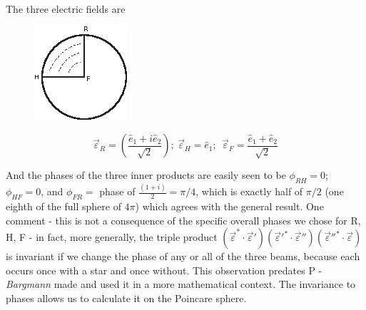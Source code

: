The three electric fields are
\begin{figure}[H]
\centering
\includegraphics[scale=0.8]{src/images/chap26/11.jpg}
\end{figure}
$$
\overrightarrow{\varepsilon}_R = \left(\frac{\hat{e}_1 + i \hat{e}_2}{\sqrt{2}} \right); ~ \overrightarrow{\varepsilon}_H = \hat{e}_1 ; ~~ \overrightarrow{\varepsilon}_F = \frac{\hat{e}_1  + \hat{e}_2}{\sqrt{2}}
$$

And the phases of the three inner products are easily seen to be $\phi_{RH} = 0$; $\phi_{HF} =0$, and $\phi_{FR} =$ phase of $\frac{(1+i)}{2} = \pi/4$, which is exactly half of $\pi/2$ (one eighth of the full sphere of $4\pi$) which agrees with the general result. One comment - this is not a consequence of the specific overall phases we chose for R, H, F - in fact, more generally, the triple product $(\overrightarrow{\varepsilon}^{\ast} \cdot \overrightarrow{\varepsilon}')(\overrightarrow{\varepsilon}'^{\ast} \cdot \overrightarrow{\varepsilon}'')(\overrightarrow{\varepsilon}''^{\ast} \cdot \overrightarrow{\varepsilon})$ is invariant if we change the phase of any or all of the three beams, because each occurs once with a star and once without. This observation predates P - \textit{Bargmann} made and used it in a more mathematical context. The invariance
to phases allows us to calculate it on the Poincare sphere.

